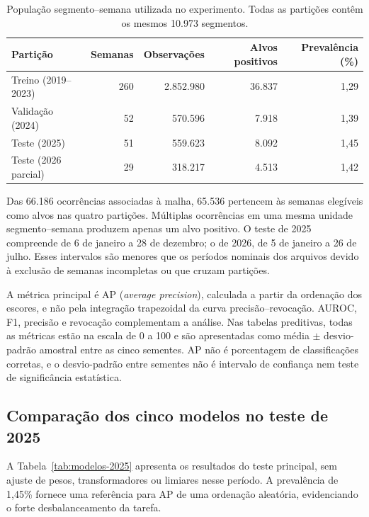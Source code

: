 \documentclass[12pt]{article}
\begin{document}
\begin{table}[!ht]
\centering
\caption{População segmento--semana utilizada no experimento.
Todas as partições contêm os mesmos 10.973 segmentos.}
\label{tab:populacao-modelos}
\small
\setlength{\tabcolsep}{4pt}
\begin{tabular}{lrrrr}
\toprule
\textbf{Partição} & \textbf{Semanas} & \textbf{Observações} &
\textbf{Alvos positivos} & \textbf{Prevalência (\%)} \\
\midrule
Treino (2019--2023) & 260 & 2.852.980 & 36.837 & 1,29 \\
Validação (2024) & 52 & 570.596 & 7.918 & 1,39 \\
Teste (2025) & 51 & 559.623 & 8.092 & 1,45 \\
Teste (2026 parcial) & 29 & 318.217 & 4.513 & 1,42 \\
\bottomrule
\end{tabular}
\end{table}

Das 66.186 ocorrências associadas à malha, 65.536 pertencem às semanas
elegíveis como alvos nas quatro partições. Múltiplas ocorrências em uma
mesma unidade segmento--semana produzem apenas um alvo positivo.
O teste de 2025 compreende de 6 de janeiro a 28 de dezembro; o de 2026,
de 5 de janeiro a 26 de julho. Esses intervalos são menores que os
períodos nominais dos arquivos devido à exclusão de semanas incompletas
ou que cruzam partições.

A métrica principal é AP (\textit{average precision}), calculada a
partir da ordenação dos escores, e não pela integração trapezoidal da
curva precisão--revocação. AUROC, F1, precisão e revocação complementam
a análise. Nas tabelas preditivas, todas as métricas estão na escala de
0 a 100 e são apresentadas como média $\pm$ desvio-padrão amostral entre
as cinco sementes. AP não é porcentagem de classificações corretas,
e o desvio-padrão entre sementes não é intervalo de confiança nem
teste de significância estatística.

\subsection{Comparação dos cinco modelos no teste de 2025}

A Tabela~\ref{tab:modelos-2025} apresenta os resultados do teste
principal, sem ajuste de pesos, transformadores ou limiares nesse
período. A prevalência de 1,45\% fornece uma referência para AP de
uma ordenação aleatória, evidenciando o forte desbalanceamento da tarefa.
\end{document}
